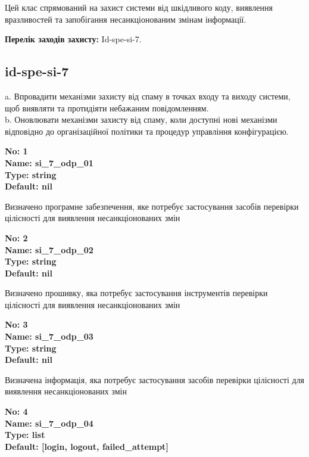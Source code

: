 \documentclass{article}
\begin{document}
Цей клас спрямований на захист системи від шкідливого коду, виявлення вразливостей та запобігання несанкціонованим змінам інформації.

\textbf{Перелік заходів захисту:} Id-spe-si-7.

\subsection{id-spe-si-7}
a. Впровадити механізми захисту від спаму в точках входу та виходу системи, щоб виявляти та протидіяти небажаним повідомленням.\\ 
b. Оновлювати механізми захисту від спаму, коли доступні нові механізми відповідно до організаційної політики та процедур управління конфігурацією.

\vspace{10pt}
{\footnotesize\bfseries
No: 1\\
Name: si\_\allowbreak{}7\_\allowbreak{}odp\_\allowbreak{}01\\
Type: string\\
Default: nil
}

{\footnotesize Визначено програмне забезпечення, яке потребує застосування засобів перевірки цілісності для виявлення несанкціонованих змін}


{\footnotesize\bfseries
No: 2\\
Name: si\_\allowbreak{}7\_\allowbreak{}odp\_\allowbreak{}02\\
Type: string\\
Default: nil
}

{\footnotesize Визначено прошивку, яка потребує застосування інструментів перевірки цілісності для виявлення несанкціонованих змін}


{\footnotesize\bfseries
No: 3\\
Name: si\_\allowbreak{}7\_\allowbreak{}odp\_\allowbreak{}03\\
Type: string\\
Default: nil
}

{\footnotesize Визначена інформація, яка потребує застосування засобів перевірки цілісності для виявлення несанкціонованих змін}


{\footnotesize\bfseries
No: 4\\
Name: si\_\allowbreak{}7\_\allowbreak{}odp\_\allowbreak{}04\\
Type: list\\
Default: [\textquotedbl{}login\textquotedbl{}, \textquotedbl{}logout\textquotedbl{}, \textquotedbl{}failed\_\allowbreak{}attempt\textquotedbl{}]
}
\end{document}
